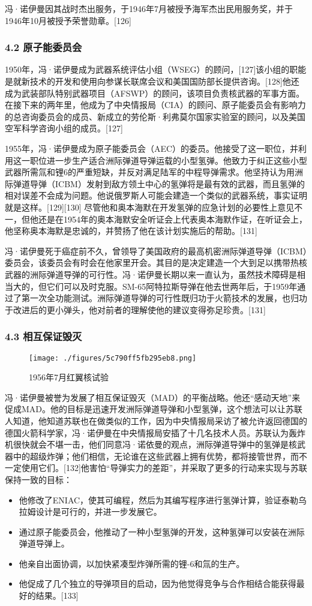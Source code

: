 冯·诺伊曼因其战时杰出服务，于1946年7月被授予海军杰出民用服务奖，并于1946年10月被授予荣誉勋章。[126]
\subsubsection{4.2 原子能委员会}
1950年，冯·诺伊曼成为武器系统评估小组（WSEG）的顾问，[127]该小组的职能是就新技术的开发和使用向参谋长联席会议和美国国防部长提供咨询。[128]他还成为武装部队特别武器项目（AFSWP）的顾问，该项目负责核武器的军事方面。在接下来的两年里，他成为了中央情报局（CIA）的顾问、原子能委员会有影响力的总咨询委员会的成员、新成立的劳伦斯·利弗莫尔国家实验室的顾问，以及美国空军科学咨询小组的成员。[127]

1955年，冯·诺伊曼成为原子能委员会（AEC）的委员。他接受了这一职位，并利用这一职位进一步生产适合洲际弹道导弹运载的小型氢弹。他致力于纠正这些小型武器所需氚和锂6的严重短缺，并反对满足陆军的中程导弹需求。他坚持认为用洲际弹道导弹（ICBM）发射到敌方领土中心的氢弹将是最有效的武器，而且氢弹的相对误差不会成为问题。他说俄罗斯人可能会建造一个类似的武器系统，事实证明就是这样。[129][130] 尽管他和奥本海默在开发氢弹的应急计划的必要性上意见不一，但他还是在1954年的奥本海默安全听证会上代表奥本海默作证，在听证会上，他坚称奥本海默是忠诚的，并赞扬了他在该计划实施后的帮助。[131]

冯·诺伊曼死于癌症前不久，曾领导了美国政府的最高机密洲际弹道导弹（ICBM）委员会，该委员会有时会在他家里开会。其目的是决定建造一个大到足以携带热核武器的洲际弹道导弹的可行性。冯·诺伊曼长期以来一直认为，虽然技术障碍是相当大的，但它们可以及时克服。SM-65阿特拉斯导弹在他去世两年后，于1959年通过了第一次全功能测试。洲际弹道导弹的可行性既归功于火箭技术的发展，也归功于改进后的更小弹头，他对前者的理解使他的建议变得弥足珍贵。[131]
\subsubsection{4.3 相互保证毁灭}
\begin{figure}[ht]
\centering
\texttt{[image: ./figures/5c790ff5fb295eb8.png]}
\caption{1956年7月红翼核试验} \label{fig_von_7}
\end{figure}
冯·诺伊曼被誉为发展了相互保证毁灭（MAD）的平衡战略。他还“感动天地”来促成MAD。他的目标是迅速开发洲际弹道导弹和小型氢弹，这个想法可以让苏联人知道，他知道苏联也在做类似的工作，因为中央情报局采访了被允许返回德国的德国火箭科学家，冯·诺伊曼在中央情报局安插了十几名技术人员。苏联认为轰炸机很快就会不堪一击，他们同意冯·诺依曼的观点，洲际弹道导弹中的氢弹是核武器中的超级炸弹；他们相信，无论谁在这些武器上拥有优势，都将接管世界，而不一定使用它们。[132]他害怕“导弹实力的差距”，并采取了更多的行动来实现与苏联保持一致的目标：
\begin{itemize}
\item 他修改了ENIAC，使其可编程，然后为其编写程序进行氢弹计算，验证泰勒乌拉姆设计是可行的，并进一步发展它。
\item 通过原子能委员会，他推动了一种小型氢弹的开发，这种氢弹可以安装在洲际弹道导弹上。
\item 他亲自出面协调，以加快紧凑型炸弹所需的锂-6和氚的生产。
\item 他促成了几个独立的导弹项目的启动，因为他觉得竞争与合作相结合能获得最好的结果。[133]
\end{itemize}

